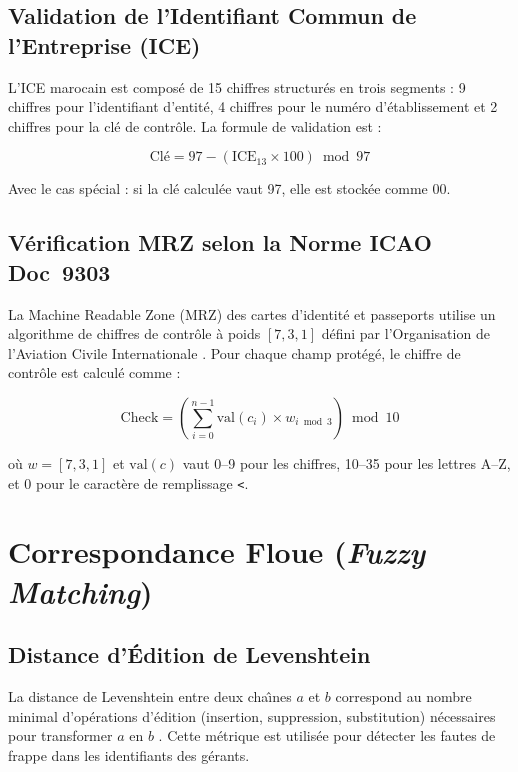 \subsection{Validation de l'Identifiant Commun de l'Entreprise (ICE)}

L'ICE marocain est compos\'{e} de 15 chiffres structur\'{e}s en trois segments : 9 chiffres pour l'identifiant d'entit\'{e}, 4 chiffres pour le num\'{e}ro d'\'{e}tablissement et 2 chiffres pour la cl\'{e} de contr\^{o}le. La formule de validation est :

\begin{equation}
\text{Cl\'{e}} = 97 - \left( \text{ICE}_{13} \times 100 \right) \bmod 97
\label{eq:modulo97-ice}
\end{equation}

Avec le cas sp\'{e}cial : si la cl\'{e} calcul\'{e}e vaut 97, elle est stock\'{e}e comme 00.

\subsection{V\'{e}rification MRZ selon la Norme ICAO Doc~9303}

La Machine Readable Zone (MRZ) des cartes d'identit\'{e} et passeports utilise un algorithme de chiffres de contr\^{o}le \`{a} poids $[7, 3, 1]$ d\'{e}fini par l'Organisation de l'Aviation Civile Internationale \cite{icao-mrz}. Pour chaque champ prot\'{e}g\'{e}, le chiffre de contr\^{o}le est calcul\'{e} comme :

\begin{equation}
\text{Check} = \left( \sum_{i=0}^{n-1} \text{val}(c_i) \times w_{i \bmod 3} \right) \bmod 10
\label{eq:mrz-check}
\end{equation}

o\`{u} $w = [7, 3, 1]$ et $\text{val}(c)$ vaut 0--9 pour les chiffres, 10--35 pour les lettres A--Z, et 0 pour le caract\`{e}re de remplissage \texttt{<}.

\section{Correspondance Floue (\textit{Fuzzy Matching})}

\subsection{Distance d'\'{E}dition de Levenshtein}

La distance de Levenshtein entre deux cha\^{\i}nes $a$ et $b$ correspond au nombre minimal d'op\'{e}rations d'\'{e}dition (insertion, suppression, substitution) n\'{e}cessaires pour transformer $a$ en $b$ \cite{levenshtein-1966}. Cette m\'{e}trique est utilis\'{e}e pour d\'{e}tecter les fautes de frappe dans les identifiants des g\'{e}rants.

